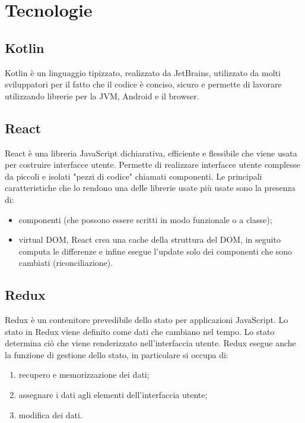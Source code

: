 
\chapter{Tecnologie}
\label{cap:tecnologie-strumenti}


\section{Kotlin}
Kotlin è un linguaggio tipizzato, realizzato da JetBrains, utilizzato da molti sviluppatori per il fatto che il codice è conciso, sicuro e permette di lavorare utilizzando librerie per la JVM, Android e il browser.

\section{React}
React è una libreria JavaScript dichiarativa, efficiente e flessibile che viene usata per costruire interfacce utente. Permette di realizzare interfacce utente complesse da piccoli e isolati "pezzi di codice" chiamati componenti. Le principali caratteristiche che lo rendono una delle librerie usate più usate sono la presenza di:
\begin{itemize}
	\item componenti (che possono essere scritti in modo funzionale o a classe);
	\item virtual DOM, React crea una cache della struttura del DOM, in seguito computa le differenze e infine esegue l'update solo dei componenti che sono cambiati (riconciliazione). 
\end{itemize}

\section{Redux}
Redux è un contenitore prevedibile dello stato per applicazioni JavaScript. Lo stato in Redux viene definito come dati che cambiano nel tempo. Lo stato determina ciò che viene renderizzato nell'interfaccia utente. Redux esegue anche la funzione di gestione dello stato, in particolare si occupa di:
\begin{enumerate}
	\item recupero e memorizzazione dei dati;
	\item assegnare i dati agli elementi dell'interfaccia utente;
	\item modifica dei dati.
\end{enumerate}


